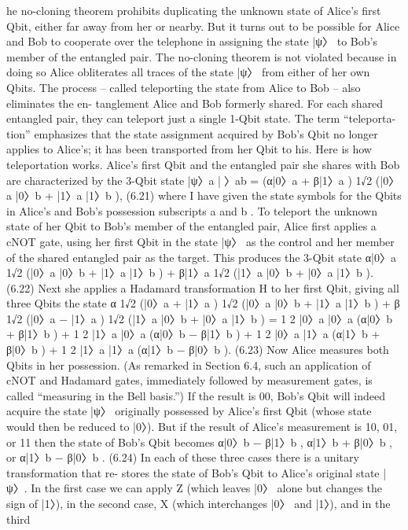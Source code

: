\documentclass{book}
\begin{document}
he no-cloning theorem prohibits duplicating the unknown state
of Alice’s first Qbit, either far away from her or nearby. But it turns
out to be possible for Alice and Bob to cooperate over the telephone
in assigning the state |ψ〉 to Bob’s member of the entangled pair. The
no-cloning theorem is not violated because in doing so Alice obliterates
all traces of the state |ψ〉 from either of her own Qbits. The process –
called teleporting the state from Alice to Bob – also eliminates the en-
tanglement Alice and Bob formerly shared. For each shared entangled
pair, they can teleport just a single 1-Qbit state. The term “teleporta-
tion” emphasizes that the state assignment acquired by Bob’s Qbit no
longer applies to Alice’s; it has been transported from her Qbit to his.
Here is how teleportation works. Alice’s first Qbit and the entangled
pair she shares with Bob are characterized by the 3-Qbit state
|ψ〉a |〉ab = (α|0〉a + β|1〉a
) 1√2
(|0〉a |0〉b + |1〉a |1〉b
), (6.21)
where I have given the state symbols for the Qbits in Alice’s and Bob’s
possession subscripts a and b . To teleport the unknown state of her
Qbit to Bob’s member of the entangled pair, Alice first applies a cNOT
gate, using her first Qbit in the state |ψ〉 as the control and her member
of the shared entangled pair as the target. This produces the 3-Qbit
state
α|0〉a 1√2
(|0〉a |0〉b + |1〉a |1〉b
) + β|1〉a 1√2
(|1〉a |0〉b + |0〉a |1〉b
).
(6.22)
Next she applies a Hadamard transformation H to her first Qbit, giving
all three Qbits the state
α 1√2
(|0〉a + |1〉a
) 1√2
(|0〉a |0〉b + |1〉a |1〉b
)
+ β 1√2
(|0〉a − |1〉a
) 1√2
(|1〉a |0〉b + |0〉a |1〉b
)
= 1
2 |0〉a |0〉a
(α|0〉b + β|1〉b
) + 1
2 |1〉a |0〉a
(α|0〉b − β|1〉b
)
+ 1
2 |0〉a |1〉a
(α|1〉b + β|0〉b
) + 1
2 |1〉a |1〉a
(α|1〉b − β|0〉b
). (6.23)
Now Alice measures both Qbits in her possession. (As remarked
in Section 6.4, such an application of cNOT and Hadamard gates,
immediately followed by measurement gates, is called “measuring in
the Bell basis.”) If the result is 00, Bob’s Qbit will indeed acquire the
state |ψ〉 originally possessed by Alice’s first Qbit (whose state would
then be reduced to |0〉). But if the result of Alice’s measurement is 10,
01, or 11 then the state of Bob’s Qbit becomes
α|0〉b − β|1〉b , α|1〉b + β|0〉b , or α|1〉b − β|0〉b . (6.24)
In each of these three cases there is a unitary transformation that re-
stores the state of Bob’s Qbit to Alice’s original state |ψ〉. In the first
case we can apply Z (which leaves |0〉 alone but changes the sign of |1〉),
in the second case, X (which interchanges |0〉 and |1〉), and in the third
\end{document}
